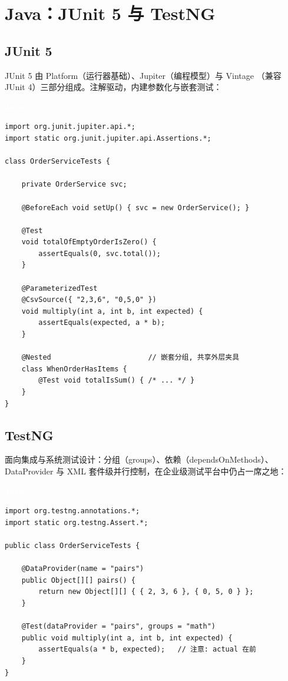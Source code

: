 \documentclass[12pt,a4paper,fontset=fandol]{ctexbook}
\newcommand{\javalabel}{%
  \begin{tcolorbox}[enhanced,colback=javaheadbg,colframe=javaheadbg,
    arc=1mm,boxrule=0mm,left=6pt,right=6pt,top=2pt,bottom=2pt,
    halign=left,oversize]
    \textcolor{white}{\small\bfseries Java}
  \end{tcolorbox}\vspace{-4pt}}
\begin{document}
\section{Java：JUnit 5 与 TestNG}

\subsection{JUnit 5}

JUnit 5 由 Platform（运行器基础）、Jupiter（编程模型）与 Vintage
（兼容 JUnit 4）三部分组成。注解驱动，内建参数化与嵌套测试：

\javalabel
\begin{lstlisting}
import org.junit.jupiter.api.*;
import static org.junit.jupiter.api.Assertions.*;

class OrderServiceTests {

    private OrderService svc;

    @BeforeEach void setUp() { svc = new OrderService(); }

    @Test
    void totalOfEmptyOrderIsZero() {
        assertEquals(0, svc.total());
    }

    @ParameterizedTest
    @CsvSource({ "2,3,6", "0,5,0" })
    void multiply(int a, int b, int expected) {
        assertEquals(expected, a * b);
    }

    @Nested                       // 嵌套分组, 共享外层夹具
    class WhenOrderHasItems {
        @Test void totalIsSum() { /* ... */ }
    }
}
\end{lstlisting}

\subsection{TestNG}

面向集成与系统测试设计：分组（groups）、依赖（dependsOnMethods）、
DataProvider 与 XML 套件级并行控制，在企业级测试平台中仍占一席之地：

\javalabel
\begin{lstlisting}
import org.testng.annotations.*;
import static org.testng.Assert.*;

public class OrderServiceTests {

    @DataProvider(name = "pairs")
    public Object[][] pairs() {
        return new Object[][] { { 2, 3, 6 }, { 0, 5, 0 } };
    }

    @Test(dataProvider = "pairs", groups = "math")
    public void multiply(int a, int b, int expected) {
        assertEquals(a * b, expected);   // 注意: actual 在前
    }
}
\end{lstlisting}
\end{document}
